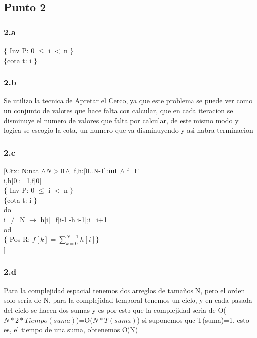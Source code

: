 \documentclass{article}
\newcommand\tab[1][1cm]{\hspace*{#1}}
\begin{document}
\subsection*{Punto 2}
\subsubsection*{2.a}

$\{$ Inv P: 0 $\leq$ i $<$ n $\}$\\
$\{$cota t: i $\}$\\ 

\subsubsection*{2.b}
Se utilizo la tecnica de Apretar el Cerco, ya que este problema se puede ver como un conjunto de valores que hace falta con calcular, que en cada iteracion se disminuye el numero de valores que falta por calcular, de este mismo modo y logica se escogio la cota, un numero que va disminuyendo y asi habra terminacion
\subsubsection*{2.c}
[Ctx: N:nat $\wedge N>0 \wedge$ f,h:[0..N-1]:\textbf{int} $\wedge$ f=F \\
i,h[0]:=1,f[0]\\
$\{$ Inv P: 0 $\leq$ i $<$ n $\}$\\
$\{$cota t: i $\}$\\ 
do \\
\tab i $\neq$ N $\rightarrow$ h[i]=f[i-1]-h[i-1];i=i+1\\
od\\
$\{$ Pos R: $f[k]=\sum_{k=0}^{N-1} h[i] \}$\\
]
\subsubsection*{2.d}
Para la complejidad espacial tenemos dos arreglos de tamaños N, pero el orden solo seria de N, para la complejidad temporal tenemos un ciclo, y en cada pasada del ciclo se hacen dos sumas y es por esto que la complejidad 
seria de O($N*2*Tiempo(suma)$)=O($N*T(suma)$) si suponemos que T(suma)=1, esto es, el tiempo de una suma, obtenemos O(N) 
\end{document}
